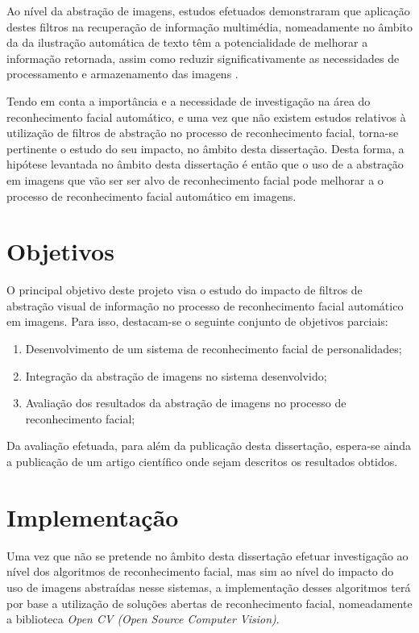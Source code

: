 Ao nível da abstração de imagens, estudos efetuados demonstraram que aplicação destes filtros na recuperação de informação multimédia, nomeadamente no âmbito da da ilustração automática de texto têm a potencialidade de melhorar a informação retornada, assim como reduzir significativamente as necessidades de processamento e armazenamento das imagens \citep{Coelho:2012:IAC:2260641.2260676}. 

Tendo em conta a importância e a necessidade de investigação na área do reconhecimento facial automático, e uma vez que não existem estudos relativos à utilização de filtros de abstração no processo de reconhecimento facial, torna-se pertinente o estudo do seu impacto, no âmbito desta dissertação. Desta forma, a hipótese levantada no âmbito desta dissertação é então que o uso de a abstração em imagens que vão ser ser alvo de reconhecimento facial pode melhorar a o processo de reconhecimento facial automático em imagens.

\section{Objetivos} \label{sec:objetivosperpectiva}
O principal objetivo deste projeto visa o estudo do impacto de filtros de abstração visual de informação no processo de reconhecimento facial automático em imagens. Para isso, destacam-se o seguinte conjunto de objetivos parciais:

\begin{enumerate}
\item Desenvolvimento de um sistema de reconhecimento facial de personalidades;
\item Integração da abstração de imagens no sistema desenvolvido;
\item Avaliação dos resultados da abstração de imagens no processo de reconhecimento facial;
\end{enumerate}

Da avaliação efetuada, para além da publicação desta dissertação, espera-se ainda a publicação de um artigo científico onde sejam descritos os resultados obtidos.

\section{Implementação} \label{sec:implementacao}

Uma vez que não se pretende no âmbito desta dissertação efetuar investigação ao nível dos algoritmos de reconhecimento facial, mas sim ao nível do impacto do uso de imagens abstraídas nesse sistemas, a implementação desses algoritmos terá por base a utilização de soluções abertas de reconhecimento facial, nomeadamente a biblioteca \textit{Open CV (Open Source Computer Vision)}.

